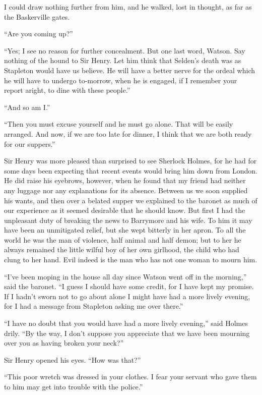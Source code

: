 \documentclass[paper=5.5in:8.5in,BCOR=7mm,twoside,DIV=calc,12pt,usegeometry,openany,chapterprefix,endperiod,headings=big]{scrbook} %
\begin{document}
I could draw nothing further from him, and he walked, lost in thought, as far as the Baskerville gates.

\enquote{Are you coming up?}

\enquote{Yes; I see no reason for further concealment. But one last word, Watson. Say nothing of the hound to Sir Henry. Let him think that Selden's death was as Stapleton would have us believe. He will have a better nerve for the ordeal which he will have to undergo to-morrow, when he is engaged, if I remember your report aright, to dine with these people.}

\enquote{And so am I.}

\enquote{Then you must excuse yourself and he must go alone. That will be easily arranged. And now, if we are too late for dinner, I think that we are both ready for our suppers.}

Sir Henry was more pleased than surprised to see Sherlock \newline Holmes, for he had for some days been expecting that recent events would bring him down from London. He did raise his eyebrows, however, when he found that my friend had neither any luggage nor any explanations for its absence. Between us we soon supplied his wants, and then over a belated supper we explained to the baronet as much of our experience as it seemed desirable that he should know. But first I had the unpleasant duty of breaking the news to Barrymore and his wife. To him it may have been an unmitigated relief, but she wept bitterly in her apron. To all the world he was the man of violence, half animal and half demon; but to her he always remained the little wilful boy of her own girlhood, the child who had clung to her hand. Evil indeed is the man who has not one woman to mourn him.

\enquote{I've been moping in the house all day since Watson went off in the morning,} said the baronet. \enquote{I guess I should have some credit, for I have kept my promise. If I hadn't sworn not to go about alone I might have had a more lively evening, for I had a message from Stapleton asking me over there.}

\enquote{I have no doubt that you would have had a more lively evening,} said Holmes drily. \enquote{By the way, I don't suppose you appreciate that we have been mourning over you as having broken your neck?}

Sir Henry opened his eyes. \enquote{How was that?}

\enquote{This poor wretch was dressed in your clothes. I fear your servant who gave them to him may get into trouble with the police.}
\end{document}
